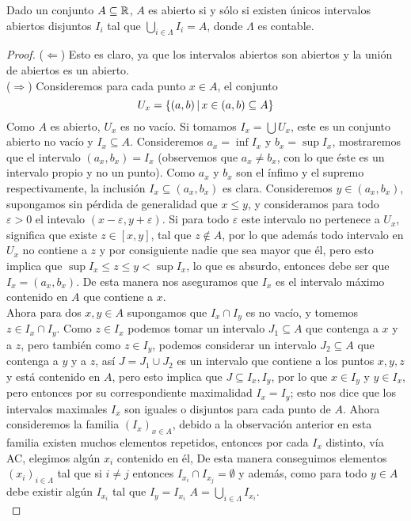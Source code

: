 \documentclass[12pt,a4paper]{book}
\begin{document}
\begin{teo}
Dado un conjunto $A \subseteq \mathbb{R}$, $A$ es abierto si y sólo si existen únicos intervalos abiertos disjuntos $I_i$ tal que $\bigcup_{i \in \Lambda} I_i = A$, donde $\Lambda$ es contable.
\begin{proof}
($\Leftarrow$) Esto es claro, ya que los intervalos abiertos son abiertos y la unión de abiertos es un abierto.\\
($\Rightarrow$) Consideremos para cada punto $x \in A$, el conjunto 
$$U_x = \{(a,b) \,\vert\, x \in (a,b)\subseteq A \}$$
Como $A$ es abierto, $U_x$ es no vacío. Si tomamos $I_x = \bigcup U_x$, este es un conjunto abierto no vacío y $I_x \subseteq A$. Consideremos $a_x = \inf I_x$ y $b_x = \sup I_x$, mostraremos que el intervalo $(a_x, b_x) = I_x$ (observemos que $a_x \neq b_x$, con lo que éste es un intervalo propio y no un punto). Como $a_x$ y $b_x$ son el ínfimo y el supremo respectivamente, la inclusión $I_x \subseteq (a_x,b_x)$ es clara. Consideremos $y \in (a_x,b_x)$, supongamos sin pérdida de generalidad que $x \leq y$, y consideramos para todo $\varepsilon >0$ el intevalo $(x-\varepsilon,y+\varepsilon)$. Si para todo $\varepsilon$ este intervalo no pertenece a $U_x$, significa que existe  $z \in [x,y]$, tal que $z \notin A$, por lo que además todo intervalo en $U_x$ no contiene a $z$ y por consiguiente nadie que sea mayor que él, pero esto implica que $\sup I_x \leq z \leq y < \sup I_x$, lo que es absurdo, entonces debe ser que $I_x = (a_x,b_x)$. De esta manera nos aseguramos que $I_x$ es el intervalo máximo contenido en $A$ que contiene a $x$.\\
Ahora para dos $x,y \in A$ supongamos que $I_x \cap I_y$ es no vacío, y tomemos $z \in I_x \cap I_y$. Como $z\in I_x$ podemos tomar un intervalo $J_1 \subseteq A$ que contenga a $x$ y a $z$, pero también como $z \in I_y$, podemos considerar un intervalo $J_2 \subseteq A$ que contenga a $y$ y a $z$, así $J=J_1 \cup J_2$ es un intervalo que contiene a los puntos $x,y,z$ y está contenido en $A$, pero esto implica que $J \subseteq I_x,I_y$, por lo que $x \in I_y$ y $y \in I_x$, pero entonces por su correspondiente maximalidad $I_x = I_y$; esto nos dice que los intervalos  maximales $I_x$ son iguales o disjuntos para cada punto de $A$. Ahora consideremos la familia $(I_x)_{x \in A}$, debido a la observación anterior en esta familia existen muchos elementos repetidos, entonces por cada $I_x$ distinto, vía AC, elegimos algún $x_i$ contenido en él, De esta manera conseguimos elementos $(x_i)_{i \in \Lambda}$ tal que si $i \neq j$ entonces $I_{x_i} \cap I_{x_j} = \emptyset$ y además, como para todo $y \in A$ debe existir algún $I_{x_i}$ tal que $I_y = I_{x_i}$ $ A = \bigcup_{i \in \Lambda} I_{x_i}$.\\

\end{proof}
\end{teo}
\end{document}
